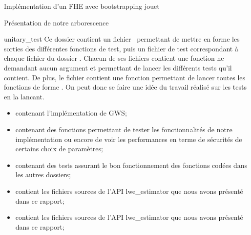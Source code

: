 \begin{section}{Implémentation d'un FHE avec bootstrapping \og{} jouet\fg~{}}
\begin{subsection}{Présentation de notre arborescence}
\begin{subsubsection}{unitary\_test}
Ce dossier contient un fichier  permettant de mettre 
en forme les sorties des différentes fonctions de test, puis un fichier 
de test correspondant à chaque fichier du dossier .
Chacun de ses fichiers contient une fonction 
ne demandant aucun argument et permettant de lancer les différents 
tests qu'il contient. De plus, le fichier 
contient une fonction  permettant de lancer toutes 
les fonctions de forme . On peut donc se faire une
idée du travail réalisé sur les tests en la lancant.
\begin{itemize}
\item {} contenant l'implémentation de GWS;
\item {} contenant des fonctions permettant 
	de tester les fonctionnalités de notre implémentation 
	ou encore de voir les performances 
	en terme de sécurités de certains choix de paramètres;
\item {} contenant des tests assurant le bon fonctionnement
	des fonctions codées dans les autres dossiers; 
\item {} contient les fichiers sources de l'API
	lwe\_estimator que nous avons présenté dans ce rapport; 
\item {} contient les fichiers sources de l'API
	lwe\_estimator que nous avons présenté dans ce rapport; 
\end{itemize}
\end{subsubsection} %

\end{subsection}
\end{section}

